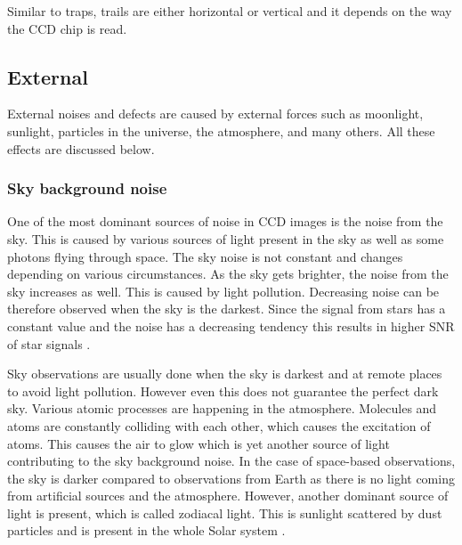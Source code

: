     Similar to traps, trails are either horizontal or vertical and it depends on the way the CCD chip is read. 
    



\subsection{External}

External noises and defects are caused by external forces such as moonlight, sunlight, particles in the universe, the atmosphere, and many others. All these effects are discussed below.

    
    \subsubsection{Sky background noise} 
    
    One of the most dominant sources of noise in CCD images is the noise from the sky. This is caused by various sources of light present in the sky as well as some photons flying through space. 
    The sky noise is not constant and changes depending on various circumstances. As the sky gets brighter, the noise from the sky increases as well. This is caused by light pollution. Decreasing noise can be therefore observed when the sky is the darkest. Since the signal from stars has a constant value and the noise has a decreasing tendency this results in higher SNR of star signals \cite{romanishin2006introduction}. 
    
    Sky observations are usually done when the sky is darkest and at remote places to avoid light pollution. However even this does not guarantee the perfect dark sky. Various atomic processes are happening in the atmosphere. Molecules and atoms are constantly colliding with each other, which causes the excitation of atoms. This causes the air to glow which is yet another source of light contributing to the sky background noise. 
    In the case of space-based observations, the sky is darker compared to observations from Earth as there is no light coming from artificial sources and the atmosphere. However, another dominant source of light is present, which is called zodiacal light. This is sunlight scattered by dust particles and is present in the whole Solar system \cite{romanishin2006introduction}.
    
